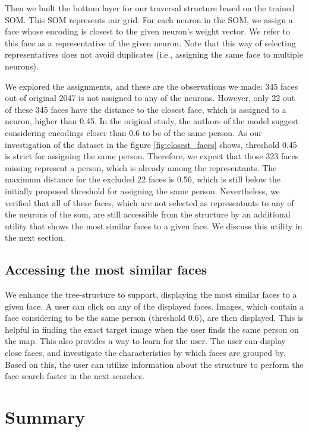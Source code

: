 Then we built the bottom layer for our traversal structure based on the trained SOM. This SOM represents our grid. For each neuron in the SOM, we assign a face whose encoding is closest to the given neuron's weight vector. We refer to this face as a representative of the given neuron.
Note that this way of selecting representatives does not avoid duplicates (i.e., assigning the same face to multiple neurons). 

We explored the assignments, and these are the observations we made: 345 faces out of original 2047 is not assigned to any of the neurons. However, only 22 out of these 345 faces have the distance to the closest face, which is assigned to a neuron, higher than 0.45. In the original study, the authors of the model suggest considering encodings closer than 0.6 to be of the same person. As our investigation of the dataset in the figure \ref{fig:closest_faces} shows, threshold 0.45 is strict for assigning the same person. Therefore, we expect that those 323 faces missing represent a person, which is already among the representants. The maximum distance for the excluded 22 faces is 0.56, which is still below the initially proposed threshold for assigning the same person. Nevertheless, we verified that all of these faces, which are not selected as representants to any of the neurons of the \acrshort{som}, are still accessible from the structure by an additional utility that shows the most similar faces to a given face. We discuss this utility in the next section.

\subsection{Accessing the most similar faces}

We enhance the tree-structure to support, displaying the most similar faces to a given face. A user can click on any of the displayed faces. Images, which contain a face considering to be the same person (threshold 0.6), are then displayed. This is helpful in finding the exact target image when the user finds the same person on the map. This also provides a way to learn for the user. The user can display close faces, and investigate the characteristics by which faces are grouped by. Based on this, the user can utilize information about the structure to perform the face search faster in the next searches.

\section{Summary}

